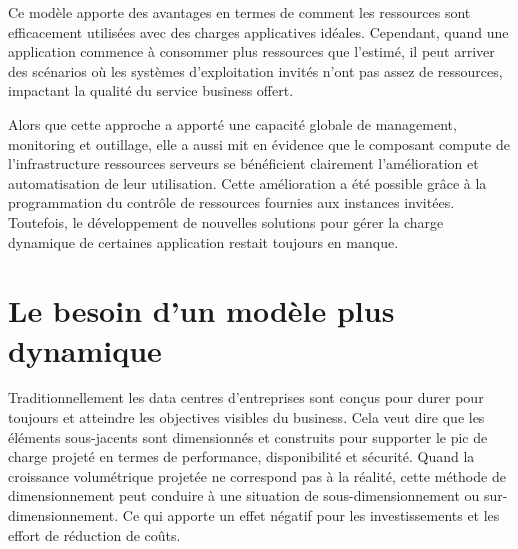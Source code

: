 Ce modèle apporte des avantages en termes de comment les ressources sont efficacement utilisées avec des charges applicatives idéales. Cependant, quand une application commence à consommer plus ressources que l'estimé, il peut arriver des scénarios où les systèmes d'exploitation invités n'ont pas assez de ressources, impactant la qualité du service business offert. 

Alors que cette approche a apporté une capacité globale de management, monitoring et outillage, elle a aussi mit en évidence que le composant compute de l'infrastructure ressources serveurs se bénéficient clairement l'amélioration et automatisation de leur utilisation. Cette amélioration a été possible grâce à la programmation du contrôle de ressources fournies aux instances invitées. Toutefois, le développement de nouvelles solutions pour gérer la charge dynamique de certaines application restait toujours en manque. \cite{ibmPlanningVirtCCchap2}\cite{journeySDDC}




\section{Le besoin d'un modèle plus dynamique}


Traditionnellement les data centres d'entreprises sont conçus pour durer pour toujours et atteindre les objectives visibles du business. Cela veut dire que les éléments sous-jacents sont dimensionnés et construits pour supporter le pic de charge projeté en termes de performance, disponibilité et sécurité. Quand la croissance volumétrique projetée ne correspond pas à la réalité, cette méthode de dimensionnement peut conduire à une situation de sous-dimensionnement ou sur-dimensionnement. Ce qui apporte un effet négatif pour les investissements et les effort de réduction de coûts.

